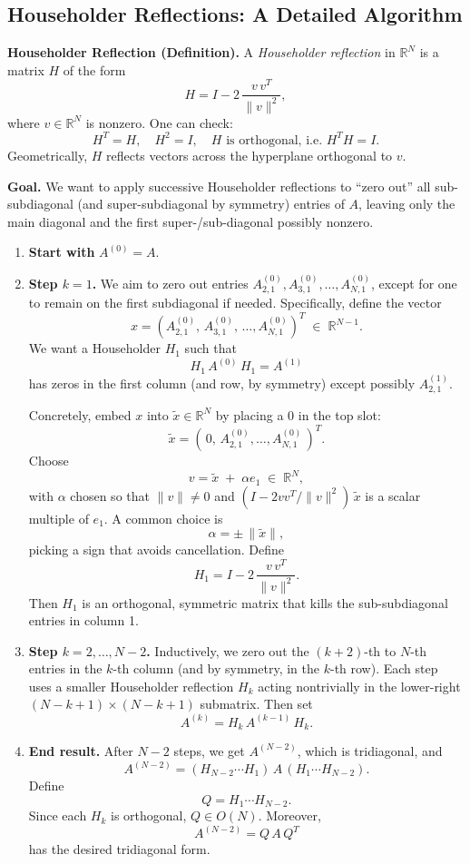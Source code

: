 \documentclass[letterpaper,11pt,oneside,reqno]{article}
\numberwithin{equation}{section}
\theoremstyle{definition}
\begin{document}
\subsection{Householder Reflections: A Detailed Algorithm}

\noindent
\textbf{Householder Reflection (Definition).}
A \emph{Householder reflection} in \(\mathbb{R}^N\) is a matrix \(H\) of the form
\[
  H = I - 2\,\frac{v\,v^T}{\|v\|^2},
\]
where \(v\in\mathbb{R}^N\) is nonzero. One can check:
\[
  H^T = H,\quad
  H^2 = I,\quad
  H\text{ is orthogonal, i.e.\ }H^T H = I.
\]
Geometrically, \(H\) reflects vectors across the hyperplane orthogonal to \(v\).

\medskip
\noindent
\textbf{Goal.}
We want to apply successive Householder reflections to “zero out” all sub-subdiagonal (and super-subdiagonal by symmetry) entries of \(A\), leaving only the main diagonal and the first super-/sub-diagonal possibly nonzero.

\begin{enumerate}[1.]
\item \textbf{Start with } \(A^{(0)}=A\).
\item \textbf{Step \(k=1\).}
   We aim to zero out entries \(A^{(0)}_{2,1},A^{(0)}_{3,1},\ldots,A^{(0)}_{N,1}\), except for one to remain on the first subdiagonal if needed. Specifically, define the vector
   \[
     x
     = (A^{(0)}_{2,1},\,A^{(0)}_{3,1},\,\dots,A^{(0)}_{N,1})^T
     \;\in\;\mathbb{R}^{N-1}.
   \]
   We want a Householder \(H_1\) such that
   \[
     H_1\,A^{(0)}\,H_1
     = A^{(1)}
   \]
   has zeros in the first column (and row, by symmetry) except possibly \(A^{(1)}_{2,1}\).

   Concretely, embed \(x\) into \(\tilde x \in \mathbb{R}^N\) by placing a \(0\) in the top slot:
   \[
     \tilde x = (\,0,\, A^{(0)}_{2,1},\ldots,A^{(0)}_{N,1}\,)^T.
   \]
   Choose
   \[
     v = \tilde x \;+\;\alpha e_1
     \;\in\;\mathbb{R}^N,
   \]
   with \(\alpha\) chosen so that
   \(\|v\|\neq 0\) and \((I - 2vv^T/\|v\|^2)\,\tilde x\) is a scalar multiple of \(e_1\).  A common choice is
   \[
     \alpha = \pm\,\|\tilde x\|,
   \]
   picking a sign that avoids cancellation.  Define
   \[
     H_1 = I - 2 \,\frac{v\,v^T}{\|v\|^2}.
   \]
   Then \(H_1\) is an orthogonal, symmetric matrix that kills the sub-subdiagonal entries in column 1.
\item \textbf{Step \(k=2,\dots,N-2\).}
   Inductively, we zero out the \((k+2)\)-th to \(N\)-th entries in the \(k\)-th column (and by symmetry, in the \(k\)-th row).  Each step uses a smaller Householder reflection \(H_k\) acting nontrivially in the lower-right \((N-k+1)\times(N-k+1)\) submatrix.  Then set
   \[
     A^{(k)} = H_k\,A^{(k-1)}\,H_k.
   \]
\item \textbf{End result.}
   After \(N-2\) steps, we get \(A^{(N-2)}\), which is tridiagonal, and
   \[
     A^{(N-2)}
     = (H_{N-2}\cdots H_1)\,A\,(H_1\cdots H_{N-2}).
   \]
   Define
   \[
     Q = H_1 \cdots H_{N-2}.
   \]
   Since each \(H_k\) is orthogonal, \(Q\in O(N)\). Moreover,
   \[
     A^{(N-2)} = Q\,A\,Q^T
   \]
   has the desired tridiagonal form.
\end{enumerate}
\end{document}
